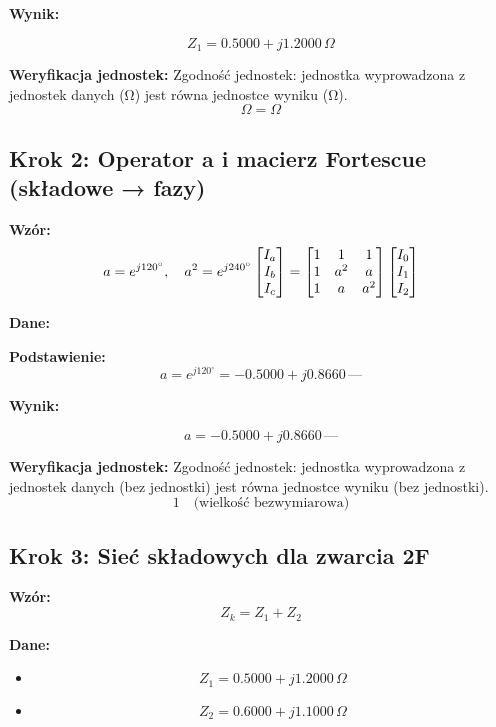 \documentclass[11pt,a4paper]{article}
\begin{document}
\textbf{Wynik:}
\begin{center}
$$
Z_1 = 0.5000 + j1.2000\,\Omega
$$
\end{center}

\textbf{Weryfikacja jednostek:} Zgodność jednostek: jednostka wyprowadzona z jednostek danych (Ω) jest równa jednostce wyniku (Ω).
$$
\Omega = \Omega
$$

\subsection{Krok 2: Operator a i macierz Fortescue (składowe → fazy)}

\textbf{Wzór:}
$$
a = e^{j 120^\circ}, \quad a^2 = e^{j 240^\circ} \\\begin{bmatrix} I_a \\ I_b \\ I_c \end{bmatrix} =\begin{bmatrix} 1 & 1 & 1 \\ 1 & a^2 & a \\ 1 & a & a^2 \end{bmatrix}\begin{bmatrix} I_0 \\ I_1 \\ I_2 \end{bmatrix}
$$

\textbf{Dane:}
\begin{itemize}
\end{itemize}

\textbf{Podstawienie:}
$$
a = e^{j 120^\circ} = -0.5000 + j0.8660\,\text{—}
$$

\textbf{Wynik:}
\begin{center}
$$
a = -0.5000 + j0.8660\,\text{—}
$$
\end{center}

\textbf{Weryfikacja jednostek:} Zgodność jednostek: jednostka wyprowadzona z jednostek danych (bez jednostki) jest równa jednostce wyniku (bez jednostki).
$$
1 \quad \text{(wielkość bezwymiarowa)}
$$

\subsection{Krok 3: Sieć składowych dla zwarcia 2F}

\textbf{Wzór:}
$$
Z_k = Z_1 + Z_2
$$

\textbf{Dane:}
\begin{itemize}
  \item
$$
Z_1 = 0.5000 + j1.2000\,\Omega
$$
  \item
$$
Z_2 = 0.6000 + j1.1000\,\Omega
$$
\end{itemize}
\end{document}
